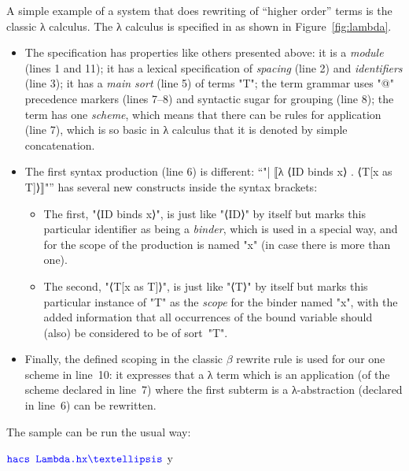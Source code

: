 \documentclass[11pt]{article} %
\begin{document}
\begin{example}
  A simple example of a system that does rewriting of ``higher order'' terms is the classic λ
  calculus. The λ calculus is specified in \HAX as shown in Figure~\ref{fig:lambda}.
  \begin{itemize}

  \item The specification has properties like others presented above: it is a \emph{module} (lines 1
    and 11); it has a lexical specification of \emph{spacing} (line 2) and \emph{identifiers} (line
    3); it has a \emph{main sort} (line 5) of terms "T"; the term grammar uses "@" precedence
    markers (lines 7--8) and syntactic sugar for grouping (line 8); the term has one \emph{scheme},
    which means that there can be rules for application (line 7), which is so basic in λ calculus
    that it is denoted by simple concatenation.

  \item The first syntax production (line 6) is different:
    ``"| ⟦λ ⟨ID binds x⟩ . ⟨T[x as T]⟩⟧"''
    has several new constructs inside the syntax brackets:
    \begin{itemize}

    \item The first, "⟨ID binds x⟩", is just like "⟨ID⟩" by itself but marks this particular
      identifier as being a \emph{binder}, which is used in a special way, and for the scope of the
      production is named "x" (in case there is more than one).

    \item The second, "⟨T[x as T]⟩", is just like "⟨T⟩" by itself but marks this particular instance
      of "T" as the \emph{scope} for the binder named "x", with the added information that all
      occurrences of the bound variable should (also) be considered to be of sort~"T".

    \end{itemize}

  \item Finally, the defined scoping in the classic $β$ rewrite rule is used for our one scheme in
    line~10: it expresses that a λ term which is an application (of the scheme declared in line~7)
    where the first subterm is a λ-abstraction (declared in line~6) can be rewritten.

  \end{itemize}
  The sample can be run the usual way:
  \begin{code}[commandchars=\\\{\}]
$ \textcolorinput{\texttt{hacs Lambda.hx}}
…
$ 
 y
  \end{code}
\end{example}
\end{document}
